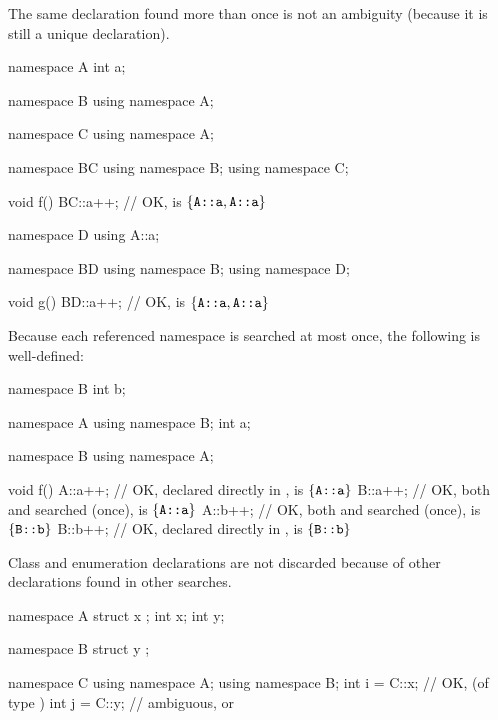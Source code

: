 \pnum
\begin{note}
The same declaration found more than once is not an ambiguity (because
it is still a unique declaration).
\begin{example}
\begin{codeblock}
namespace A {
  int a;
}

namespace B {
  using namespace A;
}

namespace C {
  using namespace A;
}

namespace BC {
  using namespace B;
  using namespace C;
}

void f()
{
  BC::a++;          // OK,  is $\{ \texttt{\protect A::a}, \texttt{\protect A::a} \}$
}

namespace D {
  using A::a;
}

namespace BD {
  using namespace B;
  using namespace D;
}

void g()
{
  BD::a++;          // OK,  is $\{ \texttt{\protect A::a}, \texttt{\protect A::a} \}$
}
\end{codeblock}
\end{example}
\end{note}

\pnum
\begin{example}
Because each referenced namespace is searched at most once, the
following is well-defined:
\begin{codeblock}
namespace B {
  int b;
}

namespace A {
  using namespace B;
  int a;
}

namespace B {
  using namespace A;
}

void f()
{
  A::a++;           // OK,  declared directly in ,  is $\{ \texttt{\protect A::a} \}$
  B::a++;           // OK, both  and  searched (once),  is $\{ \texttt{\protect A::a} \}$
  A::b++;           // OK, both  and  searched (once),  is $\{ \texttt{\protect B::b} \}$
  B::b++;           // OK,  declared directly in ,  is $\{ \texttt{\protect B::b} \}$
}
\end{codeblock}
\end{example}

\pnum
\begin{note}
Class and enumeration declarations are not discarded
because of other declarations found in other searches.
\end{note}
\begin{example}
\begin{codeblock}
namespace A {
  struct x { };
  int x;
  int y;
}

namespace B {
  struct y { };
}

namespace C {
  using namespace A;
  using namespace B;
  int i = C::x;     // OK,  (of type )
  int j = C::y;     // ambiguous,  or 
}
\end{codeblock}
\end{example}

